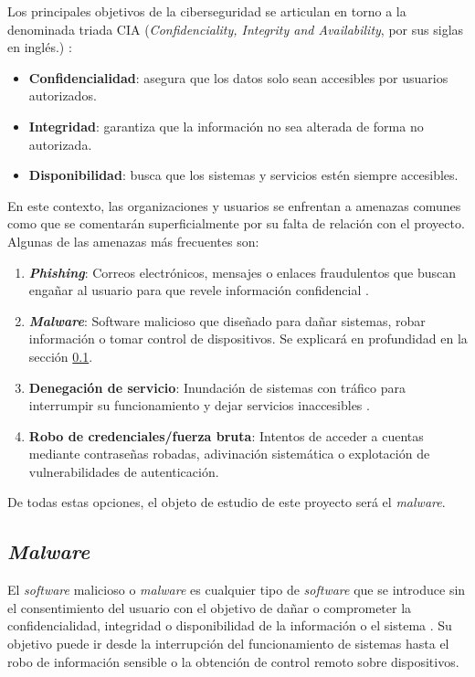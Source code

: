 \vspace{1em}

Los principales objetivos de la ciberseguridad se articulan en torno a la denominada triada CIA (\textit{Confidenciality, Integrity and Availability}, por sus siglas en inglés.) \cite{triadacia}:

\begin{itemize}
	\item \textbf{Confidencialidad}: asegura que los datos solo sean accesibles por usuarios autorizados.
	\item \textbf{Integridad}: garantiza que la información no sea alterada de forma no autorizada.
	\item \textbf{Disponibilidad}: busca que los sistemas y servicios estén siempre accesibles.
\end{itemize}

En este contexto, las organizaciones y usuarios se enfrentan a amenazas comunes como que se comentarán superficialmente por su falta de relación con el proyecto. Algunas de las amenazas más frecuentes son:

\begin{enumerate}
	\item \textbf{\textit{Phishing}}: Correos electrónicos, mensajes o enlaces fraudulentos que buscan engañar al usuario para que revele información confidencial \cite{phishing}.
	\item \textbf{\textit{Malware}}: Software malicioso que diseñado para dañar sistemas, robar información o tomar control de dispositivos. Se explicará en profundidad en la sección \ref{subsec:malware}.
	\item \textbf{Denegación de servicio}: Inundación de sistemas con tráfico para interrumpir su funcionamiento y dejar servicios inaccesibles \cite{dos}.
	\item \textbf{Robo de credenciales/fuerza bruta}: Intentos de acceder a cuentas mediante contraseñas robadas, adivinación sistemática o explotación de vulnerabilidades de autenticación.
\end{enumerate}

De todas estas opciones, el objeto de estudio de este proyecto será el \textit{malware}.

\subsection{\textit{Malware}}
\label{subsec:malware}

El \textit{software} malicioso o \textit{malware} es cualquier tipo de \textit{software} que se introduce sin el consentimiento del usuario con el objetivo de dañar o comprometer la confidencialidad, integridad o disponibilidad de la información o el sistema \cite{def_malware}. Su objetivo puede ir desde la interrupción del funcionamiento de sistemas hasta el robo de información sensible o la obtención de control remoto sobre dispositivos.

